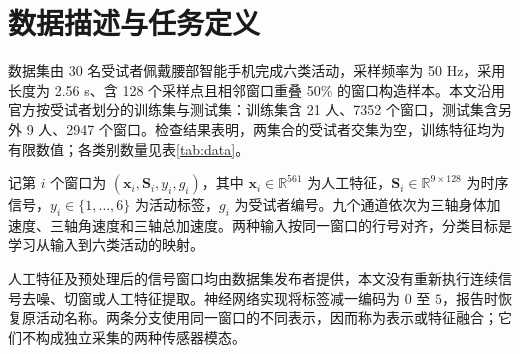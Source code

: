 \section{数据描述与任务定义}
数据集由 30 名受试者佩戴腰部智能手机完成六类活动，采样频率为 50 Hz，采用长度为 2.56 s、含 128 个采样点且相邻窗口重叠 50\% 的窗口构造样本\cite{uci,anguita2013}。本文沿用官方按受试者划分的训练集与测试集：训练集含 21 人、7352 个窗口，测试集含另外 9 人、2947 个窗口。检查结果表明，两集合的受试者交集为空，训练特征均为有限数值；各类别数量见表\ref{tab:data}。


记第 $i$ 个窗口为 $(\boldsymbol{x}_i,\boldsymbol{S}_i,y_i,g_i)$，其中 $\boldsymbol{x}_i\in\mathbb{R}^{561}$ 为人工特征，$\boldsymbol{S}_i\in\mathbb{R}^{9\times128}$ 为时序信号，$y_i\in\{1,\ldots,6\}$ 为活动标签，$g_i$ 为受试者编号。九个通道依次为三轴身体加速度、三轴角速度和三轴总加速度。两种输入按同一窗口的行号对齐，分类目标是学习从输入到六类活动的映射。

人工特征及预处理后的信号窗口均由数据集发布者提供，本文没有重新执行连续信号去噪、切窗或人工特征提取。神经网络实现将标签减一编码为 $0$ 至 $5$，报告时恢复原活动名称。两条分支使用同一窗口的不同表示，因而称为表示或特征融合；它们不构成独立采集的两种传感器模态。
